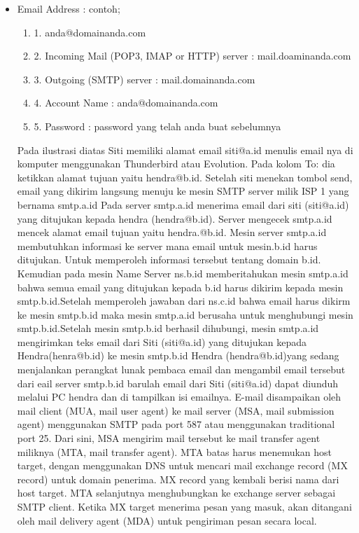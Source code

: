 \begin{itemize}
\item Email Address : contoh; 
\begin{enumerate}
\item 1. anda@domainanda.com 
\item 2. Incoming Mail (POP3, IMAP or HTTP) server : mail.doaminanda.com 
\item 3. Outgoing (SMTP) server : mail.domainanda.com 
\item 4. Account Name : anda@domainanda.com 
\item 5. Password : password yang telah anda buat sebelumnya
\end{enumerate} 
Pada ilustrasi diatas Siti memiliki alamat email siti@a.id menulis email nya di komputer menggunakan Thunderbird atau Evolution. Pada kolom To: dia ketikkan alamat tujuan yaitu hendra@b.id. Setelah siti menekan tombol send, email yang dikirim langsung menuju ke mesin SMTP server milik ISP 1 yang bernama smtp.a.id
Pada server smtp.a.id menerima email dari siti (siti@a.id) yang ditujukan kepada hendra (hendra@b.id). Server mengecek smtp.a.id mencek alamat email tujuan yaitu hendra.@b.id. Mesin server smtp.a.id membutuhkan informasi ke server mana email untuk mesin.b.id harus ditujukan. Untuk memperoleh informasi tersebut tentang domain b.id. 
Kemudian pada mesin Name Server ns.b.id memberitahukan mesin smtp.a.id bahwa semua email yang ditujukan kepada b.id harus dikirim kepada mesin smtp.b.id.Setelah memperoleh jawaban dari ns.c.id bahwa email harus dikirm ke mesin smtp.b.id maka mesin smtp.a.id berusaha untuk menghubungi mesin smtp.b.id.Setelah mesin smtp.b.id berhasil dihubungi, mesin smtp.a.id mengirimkan teks email dari Siti (siti@a.id) yang ditujukan kepada Hendra(henra@b.id) ke mesin smtp.b.id 
Hendra (hendra@b.id)yang sedang menjalankan perangkat lunak pembaca email dan mengambil email tersebut dari eail server smtp.b.id barulah email dari Siti (siti@a.id) dapat diunduh melalui PC hendra dan di tampilkan isi emailnya. 
E-mail disampaikan oleh mail client (MUA, mail user agent) ke mail server (MSA, mail submission agent) menggunakan SMTP pada port 587 atau menggunakan traditional port 25. Dari sini, MSA mengirim mail tersebut ke mail transfer agent miliknya (MTA, mail transfer agent). MTA batas harus menemukan host target, dengan menggunakan DNS untuk mencari mail exchange record (MX record) untuk domain penerima. MX record yang kembali berisi nama dari host target. MTA selanjutnya menghubungkan ke exchange server sebagai SMTP client. Ketika MX target menerima pesan yang masuk, akan ditangani oleh mail delivery agent (MDA) untuk pengiriman pesan secara local. \par

\end{itemize}
